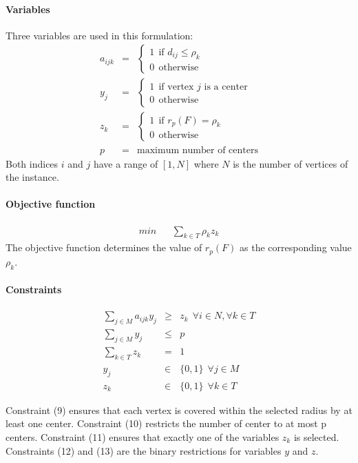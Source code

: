 \documentclass[a4paper,10pt]{article}
\begin{document}
	\paragraph{Variables} Three variables are used in this formulation:
	\begin{eqnarray*}
		a_{ijk} &=& \begin{cases}
 				1 ~~\text{if $d_{ij} \leq \rho_k$} \\
 				0 ~~\text{otherwise}
 			\end{cases} \\
		y_j &=& \begin{cases}
 				1 ~~\text{if vertex $j$ is a center} \\
 				0 ~~\text{otherwise}
 			\end{cases} \\
 		z_{k} &=& \begin{cases}
 				1 ~~\text{if $r_p(F) = \rho_k$} \\
 				0 ~~\text{otherwise}
 			\end{cases} \\
 		p &=& \text{maximum number of centers}
	\end{eqnarray*}
	Both indices $i$ and $j$ have a range of $[1, N]$ where $N$ is the number of vertices of the instance. 
	
	\paragraph{Objective function}
	\begin{eqnarray}
		min && \sum_{k \in T} \rho_{k} z_{k}	\end{eqnarray}
	The objective function determines the value of $r_p(F)$ as the corresponding value $\rho_k$.
	
	\paragraph{Constraints}
	\begin{eqnarray}
    	\sum_{j \in M} a_{ijk} y_{j} &\geq& z_k ~~\forall i \in N, \forall k \in T \\
		\sum_{j \in M} y_{j} &\leq& p \\
		\sum_{k \in T} z_{k} &=& 1 \\
		y_j &\in& \{ 0,1 \} ~~\forall j \in M \\
		z_{k} &\in& \{0 , 1 \} ~~\forall k \in T 
	\end{eqnarray}
	
	Constraint (9) ensures that each vertex is covered within the selected radius by at least one center.
	Constraint (10) restricts the number of center to at most p centers.
	Constraint (11) ensures that exactly one of the variables $z_k$ is selected. 
	Constraints (12) and (13) are the binary restrictions for variables $y$ and $z$. 
	
\end{document}
